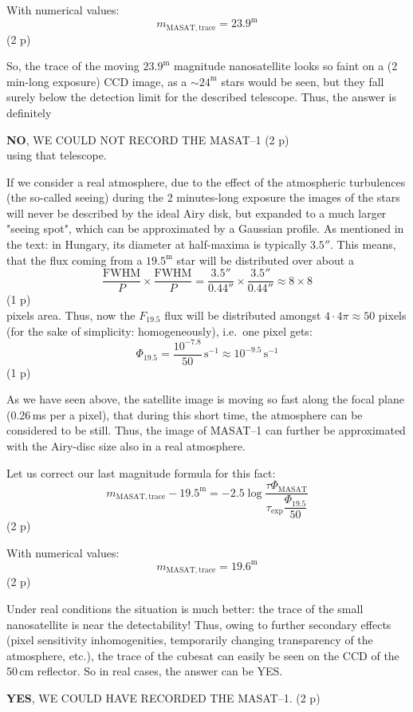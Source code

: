 \begin{description}
With numerical values:
\[ m_{\mathrm{MASAT,trace}} = 23.9^{\mathrm{m}} \]
\hfill(2 p)

So, the trace of the moving $23.9^{\mathrm{m}}$ magnitude nanosatellite looks
so faint on a (2\,min-long exposure) CCD image, as a $\sim 24^{\mathrm{m}}$
stars would be seen, but they fall surely below the detection limit for the
described telescope. Thus, the answer is definitely

\textbf{NO}, WE COULD NOT RECORD THE MASAT--1 \hfill(2 p)\\
using that telescope.

\item[c)] If we consider a real atmosphere, due to the effect of the
atmospheric turbulences (the so-called seeing) during the 2 minutes-long
exposure the images of the stars will never be described by the ideal Airy
disk, but expanded to a much larger "seeing spot", which can be approximated
by a Gaussian profile. As mentioned in the text: in Hungary, its diameter at
half-maxima is typically $3.5''$. This means, that the flux coming from a
$19.5^{\mathrm{m}}$ star will be distributed over about a
\[ \frac{\mathrm{FWHM}}{P} \times \frac{\mathrm{FWHM}}{P}
   = \frac{3.5''}{0.44''} \times \frac{3.5''}{0.44''} \approx 8 \times 8 \]
\hfill(1 p)\\
pixels area. Thus, now the $F_{19.5}$ flux will be distributed amongst
$4 \cdot 4\pi \approx 50$ pixels (for the sake of simplicity:
homogeneously), i.e.\ one pixel gets:
\begin{equation*}
\Phi_{19.5} = \frac{10^{-7.8}}{50}\,\mathrm{s^{-1}}
  \approx 10^{-9.5}\,\mathrm{s^{-1}} \tag{14.15}
\end{equation*}
\hfill(1 p)

As we have seen above, the satellite image is moving so fast along the focal
plane (0.26\,ms per a pixel), that during this short time, the atmosphere can
be considered to be still. Thus, the image of MASAT--1 can further be
approximated with the Airy-disc size also in a real atmosphere.

Let us correct our last magnitude formula for this fact:
\begin{equation*}
m_{\mathrm{MASAT,trace}} - 19.5^{\mathrm{m}}
  = -2.5\log\frac{\tau\Phi_{\mathrm{MASAT}}}
    {\tau_{\mathrm{exp}}\dfrac{\Phi_{19.5}}{50}} \tag{14.16}
\end{equation*}
\hfill(2 p)

With numerical values:
\[ m_{\mathrm{MASAT,trace}} = 19.6^{\mathrm{m}} \]
\hfill(2 p)

Under real conditions the situation is much better: the trace of the small
nanosatellite is near the detectability! Thus, owing to further secondary
effects (pixel sensitivity inhomogenities, temporarily changing transparency
of the atmosphere, etc.), the trace of the cubesat can easily be seen on the
CCD of the 50\,cm reflector. So in real cases, the answer can be YES.

\textbf{YES}, WE COULD HAVE RECORDED THE MASAT--1. \hfill(2 p)
\end{description}

